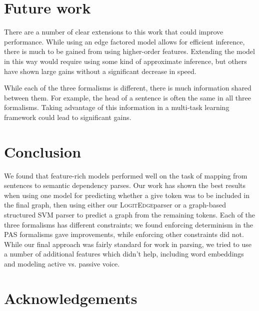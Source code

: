 \documentclass[11pt]{article}
\newcommand{\logitedge}{\textsc{LogitEdge}}
\begin{document}
\section{Future work}
There are a number of clear extensions to this work that could improve performance. While using an edge factored model allows for efficient inference, there is much to be gained from using higher-order features. Extending the model in this way would require using some kind of approximate inference, but others have shown large gains without a significant decrease in speed. 

While each of the three formalisms is different, there is much information shared between them. For example, the head of a sentence is often the same in all three formalisms. Taking advantage of this information in a multi-task learning framework could lead to significant gains. 


\section{Conclusion}
We found that feature-rich models performed well on the task of mapping from sentences to semantic dependency parses. Our work has shown the best results when using one model for predicting whether a give token was to be included in the final graph, then using either our \logitedge parser or a graph-based structured SVM parser to predict a graph from the remaining tokens. Each of the three formalisms has different constraints; we found enforcing determinism in the PAS formalisms gave improvements, while enforcing other constraints did not. While our final approach was fairly standard for work in parsing, we tried to use a number of additional features which didn't help, including word embeddings and modeling active vs. passive voice.

\nocite{flanigan-etal:ACL2014}


\section*{Acknowledgements}



\end{document}
